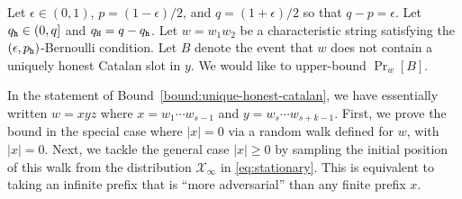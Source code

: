 


\newcommand{\gfA}{\gf{A}}
\newcommand{\gfD}{\gf{D}}
\newcommand{\gfL}{\gf{L}}
\newcommand{\gfLhat}{\gf{\hat{L}}}
\newcommand{\gfLtilde}{\gf{\tilde{L}}}
\newcommand{\gfE}{\gf{E}}
\newcommand{\gfEhat}{\gf{\hat{E}}}
\newcommand{\gfEcheck}{\gf{\check{E}}}
\newcommand{\gfF}{\gf{F}}
\newcommand{\gfFhat}{\gf{\hat{F}}}
\newcommand{\gfFcheck}{\gf{\check{F}}}
\newcommand{\gfEtilde}{\gf{\tilde{E}}}
\newcommand{\gfR}{\gf{R}}
\newcommand{\gfRhat}{\gf{\hat{R}}}
\newcommand{\gfRtilde}{\gf{\tilde{R}}}

\newcommand{\gfC}{\gf{C}}
\newcommand{\gfChat}{\gf{\hat{C}}}
\newcommand{\gfCcheck}{\gf{\check{C}}}
\newcommand{\gfCtilde}{\gf{\tilde{C}}}

\newcommand{\gfM}{\gf{M}}
\newcommand{\gfMhat}{\gf{\hat{M}}}
\newcommand{\gfMtilde}{\gf{\tilde{M}}}


\newcommand{\gfX}{\gf{X}}
\newcommand{\gfXinf}{\gf{X}_\infty}

\newcommand{\EventRCat}{E_\mathsf{right-cat}}
\newcommand{\EventReset}{E_\mathsf{reset}}

\newcommand{\SeqGF}{\longleftrightarrow}





 
  Let $\epsilon \in (0,1)$,  
  $p = (1 - \epsilon)/2$, and $q = (1 + \epsilon)/2$ 
  so that $q - p = \epsilon$. 
  Let $q_{\mathtt{h}} \in (0, q]$ and $q_{\mathtt{H}} = q - q_{\mathtt{h}}$. 
  Let $w = w_1 w_2 $ be a characteristic string 
  satisfying the $(\epsilon, p_{\mathtt{h}})$-Bernoulli condition. 
  Let $B$ denote the event that 
  $w$ does not contain a uniquely honest Catalan slot in $y$. 
  We would like to upper-bound $\Pr_w[B]$.

  In the statement of Bound~\ref{bound:unique-honest-catalan}, 
  we have essentially written $w = xyz$ where $x = w_1 \cdots w_{s-1}$ and $y = w_s \cdots w_{s+k-1}$. 
  First, we prove the bound in the special case where $|x| = 0$ 
  via a random walk defined for $w$, with $|x| = 0$. 
  Next, we tackle the general case $|x| \geq 0$
  by sampling the initial position of this walk
  from the distribution $\mathcal{X}_\infty$ in \eqref{eq:stationary}. 
  This is equivalent to taking an infinite prefix that is ``more adversarial'' 
  than any finite prefix $x$.



